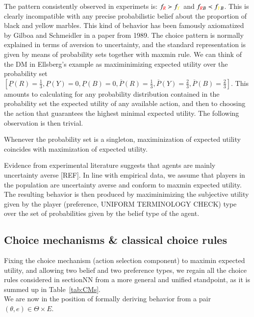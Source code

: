 \documentclass[fleqn,reqno,11pt]{article}
\begin{document}
The pattern consistently observed in experimets is: $f_{{\color{red}R}} \succ f_{{\color{yellow}Y}}$ and $f_{{\color{red}R}B} \prec f_{{\color{yellow}Y}B}$. This is clearly incompatible with any precise probabilistic belief about the proportion of black and yellow marbles. This kind of behavior has been
famously axiomatized by Gilboa and Schmeidler in a paper from 1989. The choice pattern is normally explained in terms of aversion to uncertainty, and the standard representation is given by means of probability sets together with maxmin rule. We can think of the DM in Ellsberg's example as maximinimizing expected utility over the probability set $ [\underline{P}(R)=\frac{1}{3},\underline{P}(Y)=0,\underline{P}(B)=0,\overline{P}(R)=\frac{1}{3},\overline{P}(Y)=\frac{2}{3},\overline{P}(B)=\frac{2}{3}]  $. This amounts to calculating for any probability distribution contained in the probability set the expected utility of any available action, and then to choosing the action that guarantees the highest minimal expected utility. The following observation is then trivial.

\begin{fact} \label{fact:singleton probability set}
Whenever the probability set is a singleton, maximinization of
expected utility coincides with maximization of expected utility.
\end{fact}

Evidence from experimental literature suggests that agents are mainly uncertainty
averse [REF]. In line with empirical data,
we assume that players in the population are uncertainty averse and conform to maxmin expected
utility. The resulting behavior is then produced by maximinimizing the subjective utility
given by the player (preference, UNIFORM TERMINOLOGY CHECK) type over the set of probabilities given by the belief type of the agent.



\subsection{Choice mechanisms \& classical choice rules}

Fixing the choice mechanism (action selection component) to maximin expected utility, and allowing two belief and
two preference types, we regain all the choice rules considered in sectionNN from a more general and unified standpoint, as it is summed up in
Table~\ref{tab:CMs}. \\
We are now in the position of formally deriving behavior from a pair $(\theta, e) \in \Theta \times E$.
\end{document}

